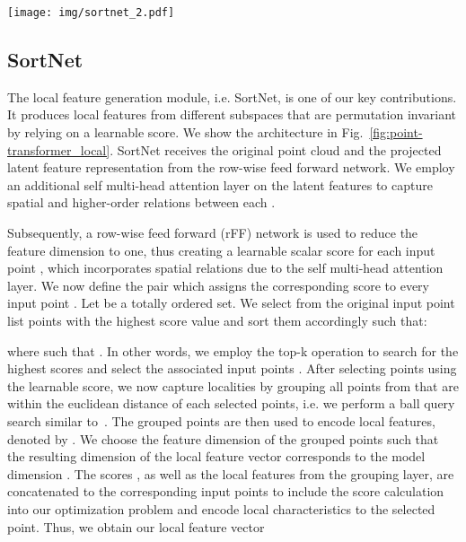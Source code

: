 \documentclass{ieeeaccess}
\begin{document}
\begin{figure*}
\begin{center}
\texttt{[image: img/sortnet\_2.pdf]}
\end{center}
\caption{Overview of the SortNet. A score is learned from a latent feature representation to extract important points from the input. Local features are aggregated from neighboring points. SortNet outputs a permutation invariant and sorted feature set. Red boxes denote sorted sets.}
    \label{fig:point-transformer_local}
\end{figure*}

\subsection{SortNet}

The local feature generation module, i.e. SortNet, is one of our key contributions. It produces local features from different subspaces that are permutation invariant by relying on a learnable score.
We show the architecture in Fig.~\ref{fig:point-transformer_local}. SortNet receives the original point cloud \mbox{} and the projected latent feature representation\mbox{} from the row-wise feed forward network. We employ an additional self multi-head attention layer on the latent features to capture spatial and higher-order relations between each .

Subsequently, a row-wise feed forward (rFF) network is used to reduce the feature dimension to one, thus creating a learnable scalar score  for each input point , which incorporates spatial relations due to the self multi-head attention layer. We now define the pair which assigns the corresponding score to every input point . Let  be a totally ordered set. We select from the original input point list  points with the highest score value and sort them accordingly such that:

where  such that .  In other words, we employ the top-k operation to search for the  highest scores  and select the associated input points .
After selecting  points using the learnable score, we now capture localities by grouping all points from  that are within the euclidean distance  of each selected points, i.e. we perform a ball query search similar to~\cite{qi2017pointnet++}. The grouped points are then used to encode local features, denoted by . We choose the feature dimension of the grouped points  such that the resulting dimension of the local feature vector corresponds to the model dimension .
The scores , as well as the local features  from the grouping layer, are concatenated to the corresponding input points  to include the score calculation into our optimization problem and encode local characteristics to the selected point. Thus, we obtain our local feature vector 
\end{document}
